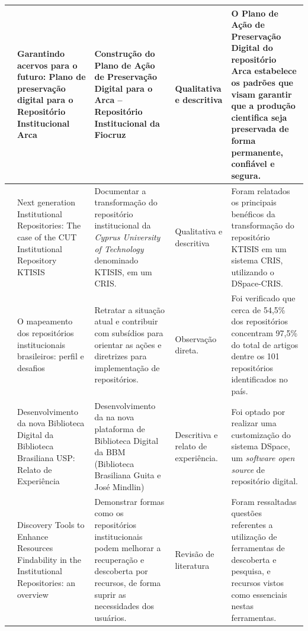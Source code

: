 \begin{landscape}
\begin{table}[H]
{\begin{tabular}{|p{3cm}|p{9cm}|p{9cm}|p{4cm}|p{9cm}|}
                \cite{2020:Queiroz}        & Garantindo acervos para o futuro: Plano de preservação digital para o Repositório Institucional Arca                      & Construção do Plano de Ação de Preservação Digital para o Arca – Repositório Institucional da Fiocruz                                                       & Qualitativa e descritiva            & O Plano de Ação de Preservação Digital do repositório Arca estabelece os padrões que visam garantir que a produção cientifica seja preservada de forma permanente, confiável e segura. \\ \hline
                \cite{2019:Zervas}         & Next generation Institutional Repositories: The case of the CUT Institutional Repository KTISIS                           & Documentar a transformação do repositório institucional da \emph{Cyprus University of Technology} denominado KTISIS, em um CRIS.                            & Qualitativa e descritiva            & Foram relatados os principais benéficos da transformação do repositório KTISIS em um sistema CRIS, utilizando o DSpace-CRIS.                                                           \\ \hline
                \cite{2019:Weitzel}        & O mapeamento dos repositórios institucionais brasileiros: perfil e desafios                                               & Retratar a situação atual e contribuir com subsídios para orientar as ações e diretrizes para implementação de repositórios.                                & Observação direta.                  & Foi verificado que cerca de 54,5\% dos repositórios concentram 97,5\% do total de artigos dentre os 101 repositórios identificados no país.                                            \\ \hline
                \cite{2019:RodrigoMoreira} & Desenvolvimento da nova Biblioteca Digital da Biblioteca Brasiliana USP: Relato de Experiência                            & Desenvolvimento da na nova plataforma de Biblioteca Digital da BBM (Biblioteca Brasiliana Guita e José Mindlin)                                             & Descritiva e relato de experiência. & Foi optado por realizar uma customização do sistema DSpace, um \emph{software open source} de repositório digital.                                                                     \\ \hline
                \cite{2019:Mettai}         & Discovery Tools to Enhance Resources Findability in the Institutional Repositories: an overview                           & Demonstrar formas como os repositórios institucionais podem melhorar a recuperação e descoberta por recursos, de forma suprir as necessidades dos usuários. & Revisão de literatura               & Foram ressaltadas questões referentes a utilização de ferramentas de descoberta e pesquisa, e recursos vistos como essenciais nestas ferramentas.                                      \\ \hline

\end{tabular}}
\end{table}
\end{landscape}
